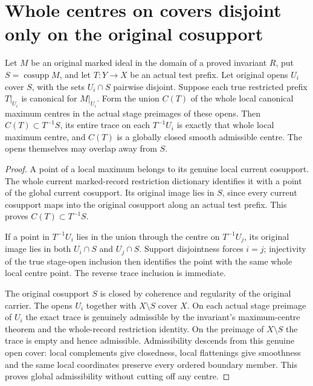 \section{Whole centres on covers disjoint only on the original cosupport}
\label{sec:hironaka-support-disjoint-canonical-centre}

\begin{theorem}
\label{hir:support-disjoint-whole-canonical-centre}
\leanok
Let $M$ be an original marked ideal in the domain of a proved
invariant $R$, put $S=\operatorname{cosupp}M$, and let $T:Y\to X$
be an actual test prefix. Let original opens $U_i$ cover $S$,
with the sets $U_i\cap S$ pairwise disjoint. Suppose each true
restricted prefix $T|_{U_i}$ is canonical for $M|_{U_i}$.
Form the union $C(T)$ of the whole local canonical maximum
centres in the actual stage preimages of these opens.
Then $C(T)\subset T^{-1}S$, its entire trace on each
$T^{-1}U_i$ is exactly that whole local maximum centre,
and $C(T)$ is a globally closed smooth admissible centre.
The opens themselves may overlap away from $S$.
\end{theorem}
\begin{proof}
A point of a local maximum belongs to its genuine local
current cosupport. The whole current marked-record restriction
dictionary identifies it with a point of the global current
cosupport. Its original image lies in $S$, since every
current cosupport maps into the original cosupport along
an actual test prefix. This proves $C(T)\subset T^{-1}S$.

If a point in $T^{-1}U_i$ lies in the union through the
centre on $T^{-1}U_j$, its original image lies in both
$U_i\cap S$ and $U_j\cap S$. Support disjointness forces
$i=j$; injectivity of the true stage-open inclusion then
identifies the point with the same whole local centre point.
The reverse trace inclusion is immediate.

The original cosupport $S$ is closed by coherence and
regularity of the original carrier. The opens $U_i$ together
with $X\setminus S$ cover $X$. On each actual stage preimage
of $U_i$ the exact trace is genuinely admissible by the
invariant's maximum-centre theorem and the whole-record
restriction identity. On the preimage of $X\setminus S$
the trace is empty and hence admissible. Admissibility
descends from this genuine open cover: local complements
give closedness, local flattenings give smoothness and
the same local coordinates preserve every ordered boundary
member. This proves global admissibility without cutting
off any centre.
\end{proof}

